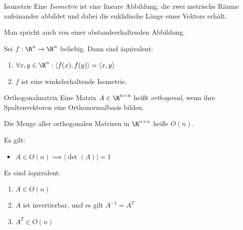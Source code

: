 \documentclass[german]{../spicker}
\newcommand{\scalarprod}[1]{\left\langle #1 \right\rangle}
\renewcommand{\abs}[1]{\left| #1 \right|}
\begin{document}
\begin{defi}{Isometrie}
    Eine \emph{Isometrie} ist eine lineare Abbildung, die zwei metrische Räume aufeinander abbildet und dabei die euklidische Länge eines Vektors erhält.

    Man spricht auch von einer abstandserhaltenden Abbildung.

    Sei $f : \R^n \to \R^n$ beliebig. Dann sind äquivalent:
    \begin{enumerate}
        \item $\forall x, y \in \R^n : \scalarprod{f(x), f(y)} = \scalarprod{x, y}$
        \item $f$ ist eine winkelerhaltende Isometrie.
    \end{enumerate}
\end{defi}

\begin{defi}{Orthogonalmatrix}
    Eine Matrix $A\in \R^{n\times n}$ heißt \emph{orthogonal}, wenn ihre Spaltenvektoren eine Orthonormalbasis bilden.

    Die Menge aller orthogonalen Matrizen in $\R^{n\times n}$ heiße $O(n)$.

    Es gilt:
    \begin{itemize}
        \item $A \in O(n) \implies \abs{\det(A)} = 1$
    \end{itemize}

    Es sind äquivalent:
    \begin{enumerate}
        \item $A \in O(n)$
        \item $A$ ist invertierbar, und es gilt $A^{-1} = A^T$
        \item $A^T \in O(n)$
    \end{enumerate}
\end{defi}
\end{document}
